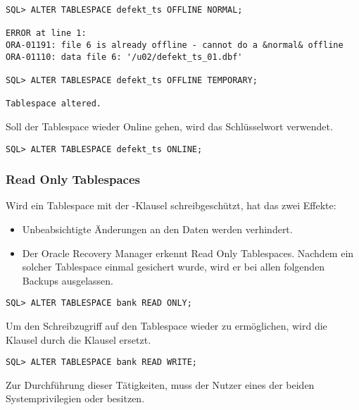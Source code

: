 \clearpage
          \begin{lstlisting}[language=oracle_sql,alsolanguage=sqlplus]
SQL> ALTER TABLESPACE defekt_ts OFFLINE NORMAL;

ERROR at line 1:
ORA-01191: file 6 is already offline - cannot do a &normal& offline
ORA-01110: data file 6: '/u02/defekt_ts_01.dbf'

SQL> ALTER TABLESPACE defekt_ts OFFLINE TEMPORARY;

Tablespace altered.
          \end{lstlisting}
          Soll der Tablespace wieder Online gehen, wird das Schlüsselwort  verwendet.
          \begin{lstlisting}[caption={Einen Tablespace online setzen},label=admin113,language=oracle_sql]
SQL> ALTER TABLESPACE defekt_ts ONLINE;
          \end{lstlisting}
        \subsubsection{Read Only Tablespaces}
          Wird ein Tablespace mit der -Klausel
          schreibgeschützt, hat das zwei Effekte:
          \begin{itemize}
            \item Unbeabsichtigte Änderungen an den Daten werden verhindert.
            \item Der Oracle Recovery Manager erkennt Read Only Tablespaces. Nachdem ein solcher Tablespace einmal gesichert wurde, wird er bei allen folgenden Backups ausgelassen.
          \end{itemize}
          \begin{lstlisting}[caption={Einen Tablespace Read Only setzen},label=admin114,language=oracle_sql]
SQL> ALTER TABLESPACE bank READ ONLY;
          \end{lstlisting}
          Um den Schreibzugriff auf den Tablespace wieder zu ermöglichen, wird die Klausel  durch die Klausel  ersetzt.
          \begin{lstlisting}[caption={Einen Tablespace Read Write setzen},label=admin115,language=oracle_sql]
SQL> ALTER TABLESPACE bank READ WRITE;
          \end{lstlisting}
          Zur Durchführung dieser Tätigkeiten, muss der Nutzer eines der beiden Systemprivilegien  oder  besitzen.
